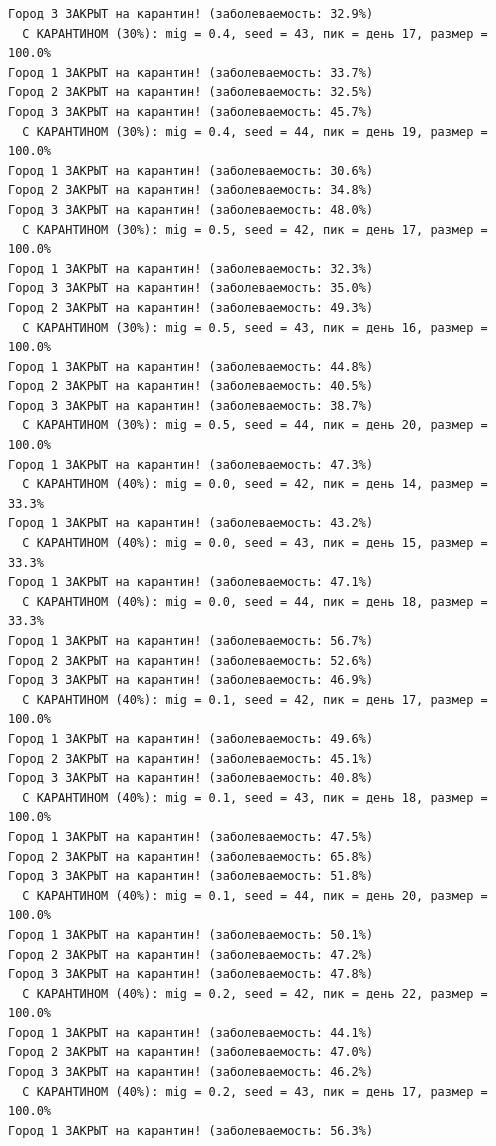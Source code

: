 \documentclass[
  12pt,
  a4paper,
  DIV=11,
  numbers=noendperiod]{scrreprt}
\begin{document}
\begin{verbatim}
Город 3 ЗАКРЫТ на карантин! (заболеваемость: 32.9%)
  С КАРАНТИНОМ (30%): mig = 0.4, seed = 43, пик = день 17, размер = 100.0%
Город 1 ЗАКРЫТ на карантин! (заболеваемость: 33.7%)
Город 2 ЗАКРЫТ на карантин! (заболеваемость: 32.5%)
Город 3 ЗАКРЫТ на карантин! (заболеваемость: 45.7%)
  С КАРАНТИНОМ (30%): mig = 0.4, seed = 44, пик = день 19, размер = 100.0%
Город 1 ЗАКРЫТ на карантин! (заболеваемость: 30.6%)
Город 2 ЗАКРЫТ на карантин! (заболеваемость: 34.8%)
Город 3 ЗАКРЫТ на карантин! (заболеваемость: 48.0%)
  С КАРАНТИНОМ (30%): mig = 0.5, seed = 42, пик = день 17, размер = 100.0%
Город 1 ЗАКРЫТ на карантин! (заболеваемость: 32.3%)
Город 3 ЗАКРЫТ на карантин! (заболеваемость: 35.0%)
Город 2 ЗАКРЫТ на карантин! (заболеваемость: 49.3%)
  С КАРАНТИНОМ (30%): mig = 0.5, seed = 43, пик = день 16, размер = 100.0%
Город 1 ЗАКРЫТ на карантин! (заболеваемость: 44.8%)
Город 2 ЗАКРЫТ на карантин! (заболеваемость: 40.5%)
Город 3 ЗАКРЫТ на карантин! (заболеваемость: 38.7%)
  С КАРАНТИНОМ (30%): mig = 0.5, seed = 44, пик = день 20, размер = 100.0%
Город 1 ЗАКРЫТ на карантин! (заболеваемость: 47.3%)
  С КАРАНТИНОМ (40%): mig = 0.0, seed = 42, пик = день 14, размер = 33.3%
Город 1 ЗАКРЫТ на карантин! (заболеваемость: 43.2%)
  С КАРАНТИНОМ (40%): mig = 0.0, seed = 43, пик = день 15, размер = 33.3%
Город 1 ЗАКРЫТ на карантин! (заболеваемость: 47.1%)
  С КАРАНТИНОМ (40%): mig = 0.0, seed = 44, пик = день 18, размер = 33.3%
Город 1 ЗАКРЫТ на карантин! (заболеваемость: 56.7%)
Город 2 ЗАКРЫТ на карантин! (заболеваемость: 52.6%)
Город 3 ЗАКРЫТ на карантин! (заболеваемость: 46.9%)
  С КАРАНТИНОМ (40%): mig = 0.1, seed = 42, пик = день 17, размер = 100.0%
Город 1 ЗАКРЫТ на карантин! (заболеваемость: 49.6%)
Город 2 ЗАКРЫТ на карантин! (заболеваемость: 45.1%)
Город 3 ЗАКРЫТ на карантин! (заболеваемость: 40.8%)
  С КАРАНТИНОМ (40%): mig = 0.1, seed = 43, пик = день 18, размер = 100.0%
Город 1 ЗАКРЫТ на карантин! (заболеваемость: 47.5%)
Город 2 ЗАКРЫТ на карантин! (заболеваемость: 65.8%)
Город 3 ЗАКРЫТ на карантин! (заболеваемость: 51.8%)
  С КАРАНТИНОМ (40%): mig = 0.1, seed = 44, пик = день 20, размер = 100.0%
Город 1 ЗАКРЫТ на карантин! (заболеваемость: 50.1%)
Город 2 ЗАКРЫТ на карантин! (заболеваемость: 47.2%)
Город 3 ЗАКРЫТ на карантин! (заболеваемость: 47.8%)
  С КАРАНТИНОМ (40%): mig = 0.2, seed = 42, пик = день 22, размер = 100.0%
Город 1 ЗАКРЫТ на карантин! (заболеваемость: 44.1%)
Город 2 ЗАКРЫТ на карантин! (заболеваемость: 47.0%)
Город 3 ЗАКРЫТ на карантин! (заболеваемость: 46.2%)
  С КАРАНТИНОМ (40%): mig = 0.2, seed = 43, пик = день 17, размер = 100.0%
Город 1 ЗАКРЫТ на карантин! (заболеваемость: 56.3%)

\end{verbatim}
\end{document}
